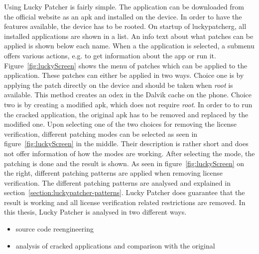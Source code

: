 Using Lucky Patcher is fairly simple.
The application can be downloaded from the official website \cite{luckyPatcherOfficial} as an \gls{apk} and installed on the device.
In order to have the features available, the device has to be rooted.
On startup of \gls{luckypatcherg}, all installed applications are shown in a list.
An info text about what patches can be applied is shown below each name.
When a the application is selected, a submenu offers various actions, e.g. to get information about the app or run it.
Figure~\ref{fig:luckyScreen} shows the menu of patches which can be applied to the application.
These patches can either be applied in two ways.
Choice one is by applying the patch directly on the device and should be taken when \textit{root} is available.
This method creates an \gls{odex} in the Dalvik cache on the phone.
Choice two is by creating a modified \gls{apk}, which does not require \textit{root}.
In order to to run the cracked application, the original \gls{apk} has to be removed and replaced by the modified one.
Upon selecting one of the two choices for removing the license verification, different patching modes can be selected as seen in figure~\ref{fig:luckyScreen} in the middle.
Their description is rather short and does not offer information of how the modes are working.
After selecting the mode, the patching is done and the result is shown.
As seen in figure~\ref{fig:luckyScreen} on the right, different patching patterns are applied when removing license verification.
The different patching patterns are analysed and explained in section~\ref{section:luckypatcher-patterns}.
Lucky Patcher does guarantee that the result is working and all license verification related restrictions are removed.
\newline
In this thesis, Lucky Patcher is analysed in two different ways.
\begin{itemize}
\item source code reengineering
\item analysis of cracked applications and comparison with the original
\end{itemize}
